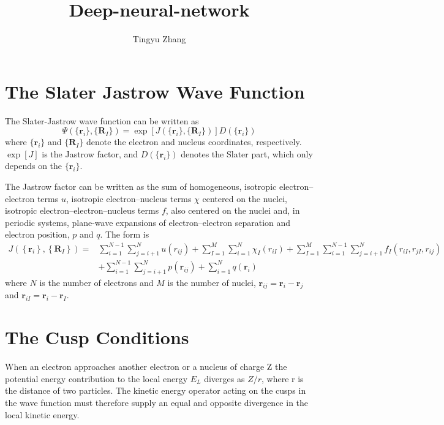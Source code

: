 \documentclass[12pt]{article}
\title{Deep-neural-network}
\date{}
\author[1]{Tingyu Zhang}
\affil[1]{Department of Physics, Graduate School of Science, The University of Tokyo, 
Tokyo 113-0033, Japan}
\begin{document}
\maketitle

\section{\large The Slater Jastrow Wave Function}

The Slater-Jastrow wave function can be written as
\begin{equation}\label{1}
    \Psi(\{\mathbf{r}_i\},\{\mathbf{R}_I\})=\exp\left[J(\{\mathbf{r}_i\},
    \{\mathbf{R}_I\})\right]D(\{\mathbf{r}_i\})
\end{equation}
where $\{\mathbf{r}_i\}$ and $\{\mathbf{R}_I\}$ denote the electron and nucleus 
coordinates, respectively. $\exp[J]$ is the Jastrow factor, and $D(\{\mathbf{r}_i\})$ 
denotes the Slater part, which only depends on the $\{\mathbf{r}_i\}$.

The Jastrow factor can be written as the sum of homogeneous, isotropic 
electron–electron terms $u$, isotropic electron–nucleus terms $\chi$ centered on the 
nuclei, isotropic electron–electron–nucleus terms $f$, also centered on the nuclei 
and, in periodic systems, plane-wave expansions of electron–electron separation 
and electron position, $p$ and $q$. The form is
\begin{equation}
    \begin{split}
        J\left(\left\{\mathbf{r}_{i}\right\},\left\{\mathbf{R}_{I}\right\}\right)
        =&\sum_{i=1}^{N-1} \sum_{j=i+1}^{N} u\left(r_{i j}\right)+\sum_{I=1}^M
        \sum_{i=1}^{N}\chi_{I}\left(r_{iI}\right)+\sum_{I=1}^M\sum_{i=1}^{N-1}
        \sum_{j=i+1}^{N}f_{I}\left(r_{iI},r_{jI},r_{ij}\right)\\
        &+\sum_{i=1}^{N-1}\sum_{j=i+1}^{N}p\left(\mathbf{r}_{ij}\right)
        +\sum_{i=1}^{N} q\left(\mathbf{r}_{i}\right)
    \end{split}
\end{equation}
where $N$ is the number of electrons and $M$ is the number of nuclei, 
$\mathbf{r}_{ij}=\mathbf{r}_i-\mathbf{r}_j$ and 
$\mathbf{r}_{iI}=\mathbf{r}_i-\mathbf{r}_I$.

\section{\large The Cusp Conditions}

When an electron approaches another electron or a nucleus of charge Z the potential 
energy contribution to the local energy $E_L$ diverges as $Z/r$, where r is the 
distance of two particles. The kinetic energy operator acting on the cusps
in the wave function must therefore supply an equal and opposite divergence in the 
local kinetic energy.
\end{document}
